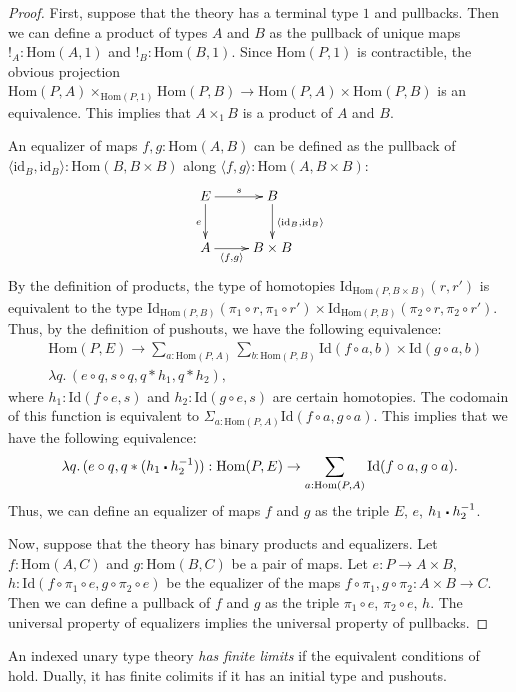 \documentclass[reqno]{mscs}
\newcommand{\fs}[1]{\mathrm{#1}}
\newcommand{\Hom}{\fs{Hom}}
\newcommand{\Id}{\fs{Id}}
\newcommand{\sym}[1]{#1^{-1}}
\newcommand{\id}{\fs{id}}
\numberwithin{figure}{section}
\newcommand{\ct}{%
  \mathchoice{\mathbin{\raisebox{0.25ex}{$\displaystyle\centerdot$}}}%
             {\mathbin{\raisebox{0.25ex}{$\centerdot$}}}%
             {\mathbin{\raisebox{0.25ex}{$\scriptstyle\,\centerdot\,$}}}%
             {\mathbin{\raisebox{0.25ex}{$\scriptscriptstyle\,\centerdot\,$}}}
}
\begin{document}
\begin{proof}
First, suppose that the theory has a terminal type $1$ and pullbacks.
Then we can define a product of types $A$ and $B$ as the pullback of unique maps $!_A : \Hom(A,1)$ and $!_B : \Hom(B,1)$.
Since $\Hom(P,1)$ is contractible, the obvious projection $\Hom(P,A) \times_{\Hom(P,1)} \Hom(P,B) \to \Hom(P,A) \times \Hom(P,B)$ is an equivalence.
This implies that $A \times_1 B$ is a product of $A$ and $B$.

An equalizer of maps $f,g : \Hom(A,B)$ can be defined as the pullback of $\langle \id_B, \id_B \rangle : \Hom(B, B \times B)$ along $\langle f, g \rangle : \Hom(A, B \times B)$:
\[ \xymatrix{ E \ar[r]^s \ar[d]_e & B \ar[d]^{\langle \id_B, \id_B \rangle} \\
              A \ar[r]_-{\langle f, g \rangle} & B \times B
            } \]
By the definition of products, the type of homotopies $\Id_{\Hom(P, B \times B)}(r,r')$ is equivalent to the type $\Id_{\Hom(P,B)}(\pi_1 \circ r, \pi_1 \circ r') \times \Id_{\Hom(P,B)}(\pi_2 \circ r, \pi_2 \circ r')$.
Thus, by the definition of pushouts, we have the following equivalence:
\begin{align*}
& \Hom(P,E) \to \sum_{a : \Hom(P,A)} \sum_{b : \Hom(P,B)} \Id(f \circ a, b) \times \Id(g \circ a, b) \\
& \lambda q.\,(e \circ q, s \circ q, q * h_1, q * h_2),
\end{align*}
where $h_1 : \Id(f \circ e, s)$ and $h_2 : \Id(g \circ e, s)$ are certain homotopies.
The codomain of this function is equivalent to $\Sigma_{a : \Hom(P,A)} \Id(f \circ a, g \circ a)$.
This implies that we have the following equivalence:
\[ \lambda q.\,(e \circ q, q * (h_1 \ct \sym{h_2})) : \Hom(P,E) \to \sum_{a : \Hom(P,A)} \Id(f \circ a, g \circ a). \]
Thus, we can define an equalizer of maps $f$ and $g$ as the triple $E$, $e$, $h_1 \ct \sym{h_2}$.

Now, suppose that the theory has binary products and equalizers.
Let $f : \Hom(A,C)$ and $g : \Hom(B,C)$ be a pair of maps.
Let $e : P \to A \times B$, $h : \Id(f \circ \pi_1 \circ e, g \circ \pi_2 \circ e)$ be the equalizer of the maps $f \circ \pi_1, g \circ \pi_2 : A \times B \to C$.
Then we can define a pullback of $f$ and $g$ as the triple $\pi_1 \circ e$, $\pi_2 \circ e$, $h$.
The universal property of equalizers implies the universal property of pullbacks.
\end{proof}

\begin{defn}
An indexed unary type theory \emph{has finite limits} if the equivalent conditions of  hold.
Dually, it has finite colimits if it has an initial type and pushouts.
\end{defn}
\end{document}
